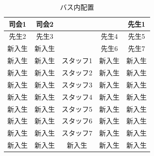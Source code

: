 

\begin{table}[htb]
  \begin{center}
  \begin{tabular}{|c|c||c||c|c|} \hline
  司会1  & 司会2  &           &        & 先生1 \\ \hline 
  先生2  & 先生3  &           & 先生4  & 先生5 \\ \hline
  新入生 & 新入生 &           & 先生6  & 先生7  \\ \hline
  新入生 & 新入生 & スタッフ1 & 新入生 & 新入生 \\ \hline
  新入生 & 新入生 & スタッフ2 & 新入生 & 新入生 \\ \hline
  新入生 & 新入生 & スタッフ3 & 新入生 & 新入生 \\ \hline
  新入生 & 新入生 & スタッフ4 & 新入生 & 新入生 \\ \hline
  新入生 & 新入生 & スタッフ5 & 新入生 & 新入生 \\ \hline
  新入生 & 新入生 & スタッフ6 & 新入生 & 新入生 \\ \hline
  新入生 & 新入生 & スタッフ7 & 新入生 & 新入生 \\ \hline
  新入生 & 新入生 &  新入生  & 新入生 & 新入生  \\ \hline

  \end{tabular}
\caption{バス内配置}
  \end{center}
\end{table}

